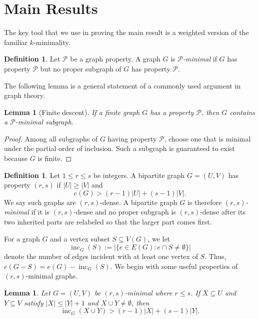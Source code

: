 \documentclass[12pt]{article}
\newtheorem{lemma}[theorem]{Lemma}
\theoremstyle{definition}
\newtheorem{definition}[theorem]{Definition}
\theoremstyle{remark}
\newcommand{\inc}{\operatorname{inc}}
\begin{document}
\section{Main Results}
\label{sec:main}
The key tool that we use in proving the main result is a weighted version of the familiar $k$-minimality.

\begin{definition}
Let $\mathcal P$ be a graph property. A graph $G$ is \emph{$\mathcal P$-minimal} if $G$ has property $\mathcal P$ but no proper subgraph of $G$ has property $\mathcal P$.
\end{definition}

The following lemma is a general statement of a commonly used argument in graph theory.
\begin{lemma}[Finite descent]\label{lem:finite-descent}
If a finite graph $G$ has a property $\mathcal P$, then $G$ contains a $\mathcal P$-minimal subgraph.
\end{lemma}
\begin{proof}
Among all subgraphs of $G$ having property $\mathcal P$, choose one that is minimal under the partial order of inclusion. Such a subgraph is guaranteed to exist because $G$ is finite.
\end{proof}





\begin{definition}\label{def:weighted-minimality}
Let $1\le r\le s$ be integers. A bipartite graph $G=(U,V)$ has property \emph{$(r,s)$} if $|U|\ge |V|$ and
\[
    e(G)>(r-1)|U|+(s-1)|V|.
\]
We say such graphs are \emph{$(r,s)$}-dense.
A bipartite graph $G$ is therefore \emph{$(r,s)$-minimal} if it is $(r,s)$-dense and no proper subgraph is $(r,s)$-dense after its two inherited parts are relabeled so that the larger part comes first.
\end{definition}

\noindent For a graph $G$ and a vertex subset $S\subseteq V(G)$, we  let
\[
    \inc_G(S):=\bigl|\{e\in E(G):e\cap S\ne\emptyset\}\bigr|
\]
denote the number of edges incident with at least one vertex of $S$. Thus, $e(G-S)=e(G)-\inc_G(S)$. We begin with some useful properties of $(r,s)$-minimal graphs.
\begin{lemma}
\label{lem:incidence}
Let $G=(U,V)$ be $(r,s)$-minimal where $r\leq s$. If $X\subseteq U$ and $Y\subseteq V$ satisfy $|X|\le |Y|+1$ and $X\cup Y\not=\emptyset$, then
\[
    \inc_G(X\cup Y)>(r-1)|X|+(s-1)|Y|.
\]
\end{lemma}
\end{document}
